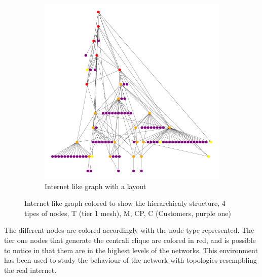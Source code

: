 \begin{figure}[h]
\begin{subfigure}[b]{0.45\textwidth}
         \includegraphics[width=\textwidth]{images/internet_graph/graph_dot.pdf}
		 \caption{Internet like graph with a  layout}
         \label{fig:internet_graph_hierarchical}
     \end{subfigure}
        \caption{Internet like graph colored to show the hierarchicaly structure,
4 tipes of nodes, T (tier 1 mesh), M, CP, C (Customers, purple one)}
        \label{fig:internet_graphs}
\end{figure}

The different nodes are colored accordingly with the node type represented.
The tier one nodes that generate the centrali clique are colored in red, and
is possible to notice in  that them are
in the highest levels of the networks.
This environment has been used to study the behaviour of the network with 
topologies resempbling the real internet.
